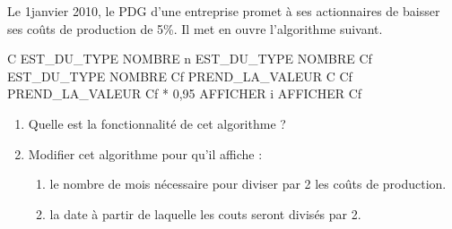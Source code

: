 
Le 1\ier janvier 2010, le PDG d'une entreprise promet à ses actionnaires de baisser ses coûts de production de 5\%. Il met en ouvre l'algorithme suivant.
\begin{algobox}
\Variables
\Ligne C EST\_DU\_TYPE NOMBRE
\Ligne n EST\_DU\_TYPE NOMBRE
\Ligne Cf EST\_DU\_TYPE NOMBRE
\DebutAlgo
\Ligne Cf PREND\_LA\_VALEUR C
\DebutPour
\Ligne Cf PREND\_LA\_VALEUR Cf * 0,95
\Ligne AFFICHER i
\Ligne AFFICHER Cf
\FinPour
\FinAlgo
\end{algobox}

\begin{enumerate}
\item Quelle est la fonctionnalité de cet algorithme ?
\item Modifier cet algorithme pour qu'il affiche :
\begin{enumerate}
\item le nombre de mois nécessaire pour diviser par 2 les coûts de production. 
\item la date à partir de laquelle les couts seront divisés par 2. 
\end{enumerate}
\end{enumerate}
